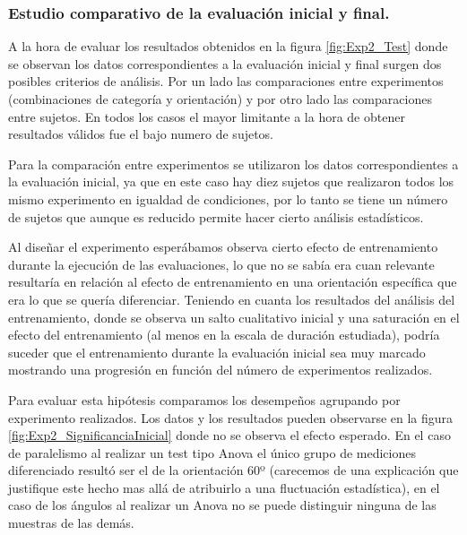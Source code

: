 \documentclass{article}
\numberwithin{figure}{section}
\begin{document}
\subsubsection{Estudio comparativo de la evaluación inicial y final.}

    A la hora de evaluar los resultados obtenidos en la figura \ref{fig:Exp2_Test} donde se observan los datos correspondientes a la evaluación inicial y final surgen dos posibles criterios de análisis. Por un lado las comparaciones entre experimentos (combinaciones de categoría y orientación) y por otro lado las comparaciones entre sujetos. En todos los casos el mayor limitante a la hora de obtener resultados válidos fue el bajo numero de sujetos. 
    
    Para la comparación entre experimentos se utilizaron los datos correspondientes a la evaluación inicial, ya que en este caso hay diez sujetos que realizaron todos los mismo experimento en igualdad de condiciones, por lo tanto se tiene un número de sujetos que aunque es reducido permite hacer cierto análisis estadísticos. 
    
    Al diseñar el experimento esperábamos observa cierto efecto de entrenamiento durante la ejecución de las evaluaciones, lo que no se sabía era cuan relevante resultaría en relación al efecto de entrenamiento en una orientación específica que era lo que  se quería diferenciar. Teniendo en cuanta los resultados del análisis del entrenamiento, donde se observa un salto cualitativo inicial y una saturación en el efecto del entrenamiento (al menos en la escala de duración estudiada), podría suceder que el entrenamiento durante la evaluación inicial sea muy marcado mostrando una progresión en función del número de experimentos realizados. 
    
    Para evaluar esta hipótesis comparamos los desempeños agrupando por experimento realizados. Los datos y los resultados pueden observarse en la figura \ref{fig:Exp2_SignificanciaInicial} donde no se observa el efecto esperado. En el caso de paralelismo al realizar un test tipo Anova el único grupo de mediciones diferenciado resultó ser el de la orientación 60º (carecemos de una explicación que justifique este hecho mas allá de atribuirlo a una fluctuación estadística), en el caso de los ángulos al realizar un Anova no se puede distinguir ninguna de las muestras de las demás. 
    
\end{document}
